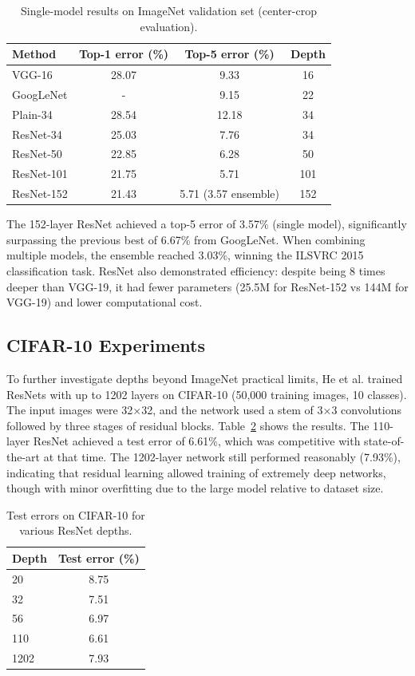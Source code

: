 \documentclass[11pt,a4paper]{article}
\begin{document}
\begin{table}[ht]
\centering
\caption{Single-model results on ImageNet validation set (center-crop evaluation).}
\label{tab:imagenet_error}
\begin{tabular}{lccc}
\toprule
Method & Top-1 error (\%) & Top-5 error (\%) & Depth \\
\midrule
VGG-16 & 28.07 & 9.33 & 16 \\
GoogLeNet & - & 9.15 & 22 \\
Plain-34 & 28.54 & 12.18 & 34 \\
ResNet-34 & 25.03 & 7.76 & 34 \\
ResNet-50 & 22.85 & 6.28 & 50 \\
ResNet-101 & 21.75 & 5.71 & 101 \\
ResNet-152 & 21.43 & 5.71 (3.57 ensemble) & 152 \\
\bottomrule
\end{tabular}
\end{table}

The 152-layer ResNet achieved a top-5 error of 3.57\% (single model), significantly surpassing the previous best of 6.67\% from GoogLeNet. When combining multiple models, the ensemble reached 3.03\%, winning the ILSVRC 2015 classification task. ResNet also demonstrated efficiency: despite being 8 times deeper than VGG-19, it had fewer parameters (25.5M for ResNet-152 vs 144M for VGG-19) and lower computational cost.

\subsection{CIFAR-10 Experiments}
To further investigate depths beyond ImageNet practical limits, He et al. trained ResNets with up to 1202 layers on CIFAR-10 (50,000 training images, 10 classes). The input images were 32×32, and the network used a stem of 3×3 convolutions followed by three stages of residual blocks. Table~\ref{tab:cifar} shows the results. The 110-layer ResNet achieved a test error of 6.61\%, which was competitive with state-of-the-art at that time. The 1202-layer network still performed reasonably (7.93\%), indicating that residual learning allowed training of extremely deep networks, though with minor overfitting due to the large model relative to dataset size.

\begin{table}[ht]
\centering
\caption{Test errors on CIFAR-10 for various ResNet depths.}
\label{tab:cifar}
\begin{tabular}{lc}
\toprule
Depth & Test error (\%) \\
\midrule
20 & 8.75 \\
32 & 7.51 \\
56 & 6.97 \\
110 & 6.61 \\
1202 & 7.93 \\
\bottomrule
\end{tabular}
\end{table}
\end{document}

